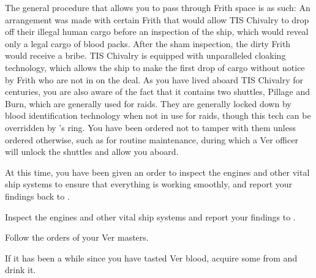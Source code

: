 \documentclass[blue]{guildcamp4}
\begin{document}
The general procedure that allows you to pass through Frith space is as such: An arrangement was made with certain Frith that would allow TIS Chivalry to drop off their illegal human cargo before an inspection of the ship, which would reveal only a legal cargo of blood packs. After the sham inspection, the dirty Frith would receive a bribe. TIS Chivalry is equipped with unparalleled cloaking technology, which allows the ship to make the first drop of cargo without notice by Frith who are not in on the deal. As you have lived aboard TIS Chivalry for centuries, you are also aware of the fact that it contains two shuttles, Pillage and Burn, which are generally used for raids. They are generally locked down by blood identification technology when not in use for raids, though this tech can be overridden by \cVone{}'s ring. You have been ordered not to tamper with them unless ordered otherwise, such as for routine maintenance, during which a Ver officer will unlock the shuttles and allow you aboard.

At this time, you have been given an order to inspect the engines and other vital ship systems to ensure that everything is working smoothly, and report your findings back to \cVtwo{}.

\begin{itemz}[Goals]
	\item Inspect the engines and other vital ship systems and report your findings to \cVtwo{}.
	\item Follow the orders of your Ver masters.
	\item If it has been a while since you have tasted Ver blood, acquire some from \cVone{} and drink it.
\end{itemz}

\begin{members}
	\member{\cJoan{}} 
	\member{\cJulie{}} 
	\member{\cJames{}} 
	\member{\cRasputin{}} 
\end{members}
\end{document}
